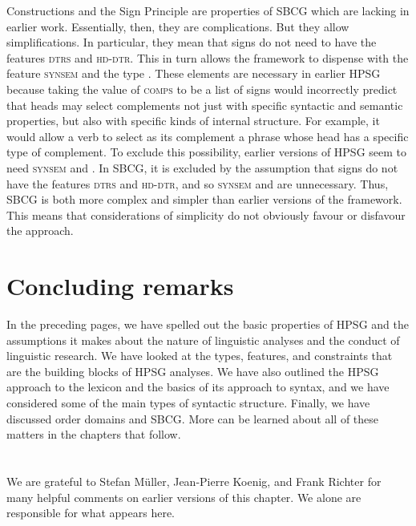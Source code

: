\documentclass[output=paper
	        ,collection
	        ,collectionchapter
 	        ,biblatex
                ,babelshorthands
                ,newtxmath
                ,draftmode
                ,colorlinks, citecolor=brown
]{langscibook}
\begin{document}
\noindent
Constructions and the Sign Principle are properties of SBCG which are lacking in earlier
work. Essentially, then, they are complications. But they allow simplifications. In particular, they
mean that signs do not need to have the features \textsc{dtrs} and \textsc{hd-dtr}. This in turn
allows the framework to dispense with the feature \textsc{synsem} and the type . These
elements are necessary in earlier HPSG because taking the value of \textsc{comps} to be a list of
signs would incorrectly predict that heads may select complements not just with specific syntactic
and semantic properties, but also with specific kinds of internal structure. For example, it would
allow a verb to select as its complement a phrase whose head has a specific type of complement. To
exclude this possibility, earlier versions of HPSG seem to need \textsc{synsem} and 
\citep[]{ps2}. In SBCG, it is excluded by the assumption that signs do not have the features
\textsc{dtrs} and \textsc{hd-dtr}, and so \textsc{synsem} and  are unnecessary. Thus,
SBCG is both more complex and simpler than earlier versions of the framework. This means that
considerations of simplicity do not obviously favour or disfavour the approach. 

\section{Concluding remarks}\label{sec:prop8}

In the preceding pages, we have spelled out the basic properties of HPSG and the assumptions it makes about the nature of linguistic analyses and the conduct of linguistic research. We have looked at the types, features, and constraints that are the building blocks of HPSG analyses. We have also outlined the HPSG approach to the lexicon and the basics of its approach to syntax, and we have considered some of the main types of syntactic structure. Finally, we have discussed order domains and SBCG. More can be learned about all of these matters in the chapters that follow.


\section*{\acknowledgmentsEN}

We are grateful to Stefan Müller, Jean-Pierre Koenig, and Frank Richter for many helpful comments on
earlier versions of this chapter. We alone are responsible for what appears here.



{\sloppy
\printbibliography[heading=subbibliography,notkeyword=this]
}
\end{document}
